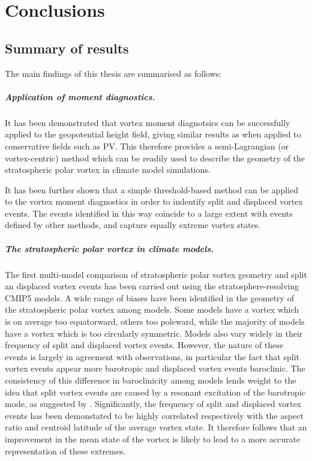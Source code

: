 \chapter{Conclusions}
\label{cha:conclusions}

\section{Summary of results}

The main findings of this thesis are summarised as follows: 

\paragraph{Application of moment diagnostics.} It has been demonstrated that
vortex moment diagnotsics can be successfully applied to the geopotential height
field, giving similar results as when applied to conservative fields such as
PV. This therefore provides a semi-Lagrangian (or vortex-centric) method which
can be readily used to describe the geometry of the stratospheric polar vortex
in climate model simulations.

It has been further shown that a simple threshold-based method can be applied to
the vortex moment diagnostics in order to indentify split and displaced vortex
events. The events identified in this way coincide to a large extent with events
defined by other methods, and capture equally extreme vortex states.

\paragraph{The stratospheric polar vortex in climate models.} The first
multi-model comparison of stratospheric polar vortex geometry and split an
displaced vortex events has been carried out using the stratosphere-resolving
CMIP5 models. A wide range of biases have been identified in the geometry of the
stratospheric polar vortex among models. Some models have a vortex which is on
average too equatorward, others too poleward, while the majority of models have
a vortex which is too circularly symmetric. Models also vary widely in their
frequency of split and displaced vortex events. However, the nature of these
events is largely in agreement with observations, in particular the fact that
split vortex events appear more barotropic and displaced vortex events
baroclinic. The consistency of this difference in baroclinicity among models
lends weight to the idea that split vortex events are caused by a resonant
excitation of the barotropic mode, as suggested by
\citet{Esler2005}. Significantly, the frequency of split and displaced vortex
events has been demonstated to be highly correlated respectively with the aspect
ratio and centroid latitude of the average vortex state. It therefore follows
that an improvement in the mean state of the vortex is likely to lead to a more
accurate representation of these extremes.

